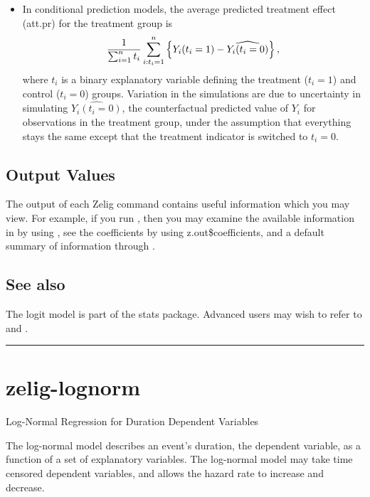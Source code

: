 \documentclass[letterpaper,10pt,english]{sphinxmanual}
\begin{document}
\begin{itemize}
\item {} 
In conditional prediction models, the average predicted treatment
effect (att.pr) for the treatment group is
\begin{gather}
\begin{split}\frac{1}{\sum_{i=1}^n t_i}\sum_{i:t_i=1}^n \left\{ Y_i(t_i=1) -
      \widehat{Y_i(t_i=0)}\right\},\end{split}\notag
\end{gather}
where \(t_i\) is a binary explanatory variable defining the
treatment (\(t_i=1\)) and control (\(t_i=0\)) groups.
Variation in the simulations are due to uncertainty in simulating
\(\widehat{Y_i(t_i=0)}\), the counterfactual predicted value of
\(Y_i\) for observations in the treatment group, under the
assumption that everything stays the same except that the treatment
indicator is switched to \(t_i=0\).

\end{itemize}


\subsection{Output Values}
\label{vignette:id10}
The output of each Zelig command contains useful information which you
may view. For example, if you run
, then you may examine the
available information in  by using , see the
coefficients by using z.out\$coefficients, and a default summary of
information through .


\subsection{See also}
\label{vignette:id11}
The logit model is part of the stats package. Advanced users may
wish to refer to  and .


\bigskip\hrule{}\bigskip



\section{zelig-lognorm}
\label{vignette:zelig-lognorm}
Log-Normal Regression for Duration Dependent Variables

The log-normal model describes an event’s duration, the dependent
variable, as a function of a set of explanatory variables. The
log-normal model may take time censored dependent variables, and allows
the hazard rate to increase and decrease.
\end{document}
